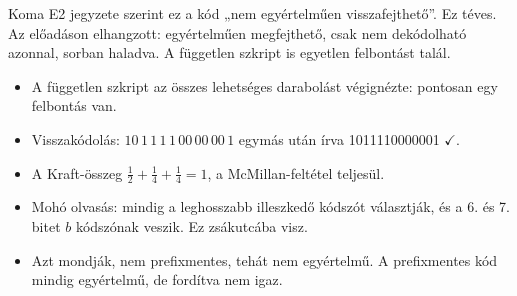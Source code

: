 \begin{center}\end{center}
\begin{figyelem}[Javítás]
Koma E2 jegyzete szerint ez a kód „nem egyértelműen visszafejthető”. Ez téves. Az előadáson elhangzott: egyértelműen megfejthető, csak nem dekódolható azonnal, sorban haladva. A független szkript is egyetlen felbontást talál.
\end{figyelem}
\begin{eredmeny}

\begin{center}\end{center}
\end{eredmeny}
\begin{tipp}[Ellenőrzés]
\begin{itemize}
\item A független szkript az összes lehetséges darabolást végignézte: pontosan egy felbontás van.
\item Visszakódolás: $10\,1\,1\,1\,1\,00\,00\,00\,1$ egymás után írva 1011110000001 $\checkmark$.
\item A Kraft-összeg $\tfrac12+\tfrac14+\tfrac14=1$, a McMillan-feltétel teljesül.
\end{itemize}
\end{tipp}
\begin{figyelem}
\begin{itemize}
\item Mohó olvasás: mindig a leghosszabb illeszkedő kódszót választják, és a 6. és 7. bitet $b$ kódszónak veszik. Ez zsákutcába visz.
\item Azt mondják, nem prefixmentes, tehát nem egyértelmű. A prefixmentes kód mindig egyértelmű, de fordítva nem igaz.
\end{itemize}
\end{figyelem}
\begin{tipp}

\par{}\par
\end{tipp}


